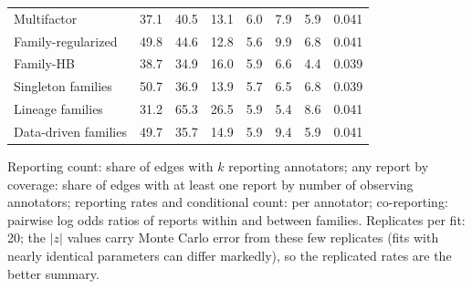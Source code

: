 \begin{table}[htbp]
\begin{tabular}{@{}lrrrrrrr@{}}
Multifactor & 37.1 & 40.5 & 13.1 & 6.0 & 7.9 & 5.9 & 0.041 \\
Family-regularized & 49.8 & 44.6 & 12.8 & 5.6 & 9.9 & 6.8 & 0.041 \\
Family-HB & 38.7 & 34.9 & 16.0 & 5.9 & 6.6 & 4.4 & 0.039 \\
Singleton families & 50.7 & 36.9 & 13.9 & 5.7 & 6.5 & 6.8 & 0.039 \\
Lineage families & 31.2 & 65.3 & 26.5 & 5.9 & 5.4 & 8.6 & 0.041 \\
Data-driven families & 49.7 & 35.7 & 14.9 & 5.9 & 9.4 & 5.9 & 0.041 \\
\bottomrule
\end{tabular}
\par\smallskip
\begin{minipage}{\linewidth}\footnotesize
Reporting count: share of edges with $k$ reporting annotators; any report by coverage: share of edges with at least one report by number of observing annotators; reporting rates and conditional count: per annotator; co-reporting: pairwise log odds ratios of reports within and between families. Replicates per fit: 20; the $|z|$ values carry Monte Carlo error from these few replicates (fits with nearly identical parameters can differ markedly), so the replicated rates are the better summary.
\end{minipage}
\end{table}
